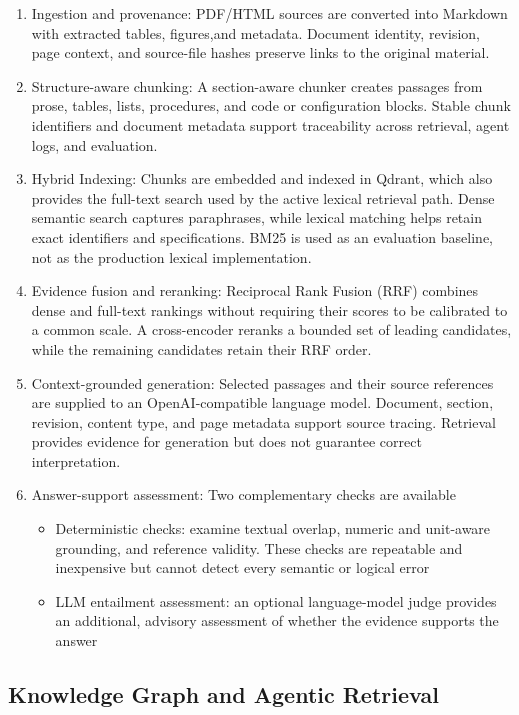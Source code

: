 \documentclass[11pt,twoside]{article}
\begin{document}
\begin{enumerate}
\item Ingestion and provenance: PDF/HTML sources are converted into Markdown with extracted tables, figures,and metadata. Document identity, revision, page context, and source-file hashes preserve links to the original material.
\item Structure-aware chunking: A section-aware chunker creates passages from prose, tables, lists, procedures, and code or configuration blocks. Stable chunk identifiers and document metadata support traceability across retrieval, agent logs, and evaluation.
\item Hybrid Indexing: Chunks are embedded and indexed in Qdrant, which also provides the full-text search used by the active lexical retrieval path. Dense semantic search captures paraphrases, while lexical matching helps retain exact identifiers and specifications. BM25 is used as an evaluation baseline, not as the production lexical implementation.
\item Evidence fusion and reranking: Reciprocal Rank Fusion (RRF) combines dense and full-text rankings without requiring their scores to be calibrated to a common scale. A cross-encoder reranks a bounded set of leading candidates, while the remaining candidates retain their RRF order.
\item Context-grounded generation: Selected passages and their source references are supplied to an OpenAI-compatible language model. Document, section, revision, content type, and page metadata support source tracing. Retrieval provides evidence for generation but does not guarantee correct interpretation.
\item Answer-support assessment: Two complementary checks are available
  \begin{itemize}
  \item Deterministic checks: examine textual overlap, numeric and unit-aware grounding, and reference validity. These checks are repeatable and inexpensive but cannot detect every semantic or logical error 
  \item LLM entailment assessment: an optional language-model judge provides an additional, advisory assessment of whether the evidence supports the answer
  \end{itemize}
\end{enumerate}

\subsection{Knowledge Graph and Agentic Retrieval}
\end{document}
